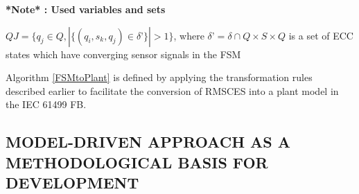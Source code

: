 \begin{bibunit}
\begin{algorithm}[t!]
{}
    \;

\textbf{ *Note* : Used variables and sets} \\
\BlankLine

$QJ= { \{ q_j \in Q , | \{(q_i, s_k, q_j) \in \delta’\}|>1} \} $, where $\delta’ = \delta \cap  Q \times S \times Q$ is a set of ECC states which have converging sensor signals in the FSM


\end{algorithm}

Algorithm \ref{FSMtoPlant} is defined by applying the transformation rules described earlier to facilitate the conversion of  RMSCES into a plant model in the IEC 61499 FB.


\subsection{MODEL-DRIVEN APPROACH AS A METHODOLOGICAL BASIS FOR DEVELOPMENT}


\end{bibunit}
